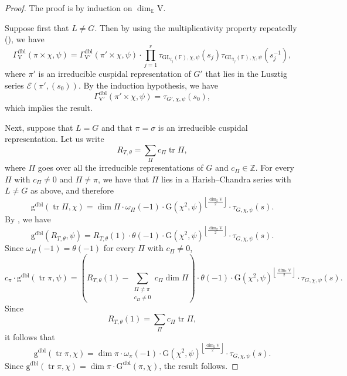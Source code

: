 \documentclass[12pt, reqno]{amsart}
\theoremstyle{definition}
\theoremstyle{definition}
\theoremstyle{definition}
\newcommand{\zIntegers}{\mathbb{Z}}
\newcommand{\hermitianSpace}{\mathrm{V}}
\newcommand{\fieldCharacter}{\psi}
\newcommand{\centralCharacter}[1]{\omega_{#1}}
\newcommand{\trace}{\operatorname{tr}}
\newcommand{\GL}{\mathrm{GL}}
\newcommand{\finiteField}{\mathbb{F}}
\newcommand{\quadraticExtension}{\mathbb{E}}
\newcommand{\GaussSumScalar}[2]{\mathrm{G}\left(#1, #2\right)}
\newcommand{\dblGaussSumScalar}[2]{\mathrm{G}^{\mathrm{dbl}}\left(#1, #2\right)}
\newcommand{\dblVirtualGaussSumScalar}[2]{\mathrm{g}^{\mathrm{dbl}}\left(#1, #2\right)}
\newcommand{\dblGammaFactorSpace}[4]{\Gamma^{\mathrm{dbl}}_{#1}\left(#2 \times #3, #4\right)}
\newcommand{\LusztigSeries}[2]{\mathcal{E}\left(#1, (#2)\right)}
\begin{document}
\begin{proof}
	The proof is by induction on $\dim_{\quadraticExtension} \hermitianSpace$.
	
	Suppose first that $L \ne G$. Then by using the multiplicativity property repeatedly (), we have $$\dblGammaFactorSpace{\hermitianSpace}{\pi}{\chi}{\fieldCharacter} = \dblGammaFactorSpace{\hermitianSpace'}{\pi'}{\chi}{\fieldCharacter} \cdot \prod_{j=1}^r \tau_{\GL_{t_j}\left(\finiteField\right), \chi, \fieldCharacter}\left(s_j\right) \tau_{\GL_{t_j}\left(\finiteField\right), \chi, \fieldCharacter}\left(s_j^{-1}\right),$$
	where $\pi'$ is an irreducible cuspidal representation of $G'$ that lies in the Lusztig series $\LusztigSeries{\pi'}{s_0}$. By the induction hypothesis, we have $$\dblGammaFactorSpace{\hermitianSpace'}{\pi'}{\chi}{\fieldCharacter} = \tau_{G', \chi, \fieldCharacter}\left(s_0\right),$$
	which implies the result.
	
	Next, suppose that $L = G$ and that $\pi = \sigma$ is an irreducible cuspidal representation. Let us write $$R_{T, \theta} = \sum_{\Pi} c_\Pi \trace \Pi,$$
	where $\Pi$ goes over all the irreducible representations of $G$ and $c_{\Pi} \in \zIntegers$. For every $\Pi$ with $c_{\Pi} \ne 0$ and $\Pi \ne \pi$, we have that $\Pi$ lies in a Harish--Chandra series with $L \ne G$ as above, and therefore $$\dblVirtualGaussSumScalar{\trace \Pi}{\chi} = \dim \Pi \cdot \centralCharacter{\Pi}\left(-1\right) \cdot \GaussSumScalar{\chi^2}{\fieldCharacter}^{\left\lfloor\frac{\dim_{\quadraticExtension} \hermitianSpace}{2}\right\rfloor} \cdot \tau_{G, \chi, \fieldCharacter}\left(s\right).$$
	By , we have $$\dblVirtualGaussSumScalar{R_{T,\theta}}{\fieldCharacter} = R_{T,\theta}\left(1\right) \cdot \theta\left(-1\right) \cdot \GaussSumScalar{\chi^2}{\fieldCharacter}^{\left\lfloor\frac{\dim_{\quadraticExtension} \hermitianSpace}{2}\right\rfloor} \cdot \tau_{G, \chi, \fieldCharacter}\left(s\right).$$
	Since $\centralCharacter{\Pi}\left(-1\right) = \theta\left(-1\right)$ for every $\Pi$ with $c_{\Pi} \ne 0$,
	$$c_{\pi} \cdot \dblVirtualGaussSumScalar{\trace \pi}{\fieldCharacter} = \left(R_{T,\theta}\left(1\right) - \sum_{\substack{\Pi \ne \pi\\
	c_{\Pi} \ne 0}} c_{\Pi} \dim \Pi\right) \cdot \theta\left(-1\right) \cdot \GaussSumScalar{\chi^2}{\fieldCharacter}^{\left\lfloor\frac{\dim_{\quadraticExtension} \hermitianSpace}{2}\right\rfloor} \cdot \tau_{G, \chi, \fieldCharacter}\left(s\right).$$
	Since $$R_{T,\theta}\left(1\right) = \sum_{\Pi} c_{\Pi} \trace \Pi,$$ it follows that $$\dblVirtualGaussSumScalar{\trace \pi}{\chi} = \dim \pi \cdot \centralCharacter{\pi}\left(-1\right) \cdot \GaussSumScalar{\chi^2}{\fieldCharacter}^{\left\lfloor\frac{\dim_{\quadraticExtension} \hermitianSpace}{2}\right\rfloor} \cdot \tau_{G, \chi, \fieldCharacter}\left(s\right).$$
	Since $\dblVirtualGaussSumScalar{\trace \pi}{\chi} = \dim \pi \cdot \dblGaussSumScalar{\pi}{\chi}$, the result follows.
\end{proof}
\end{document}
